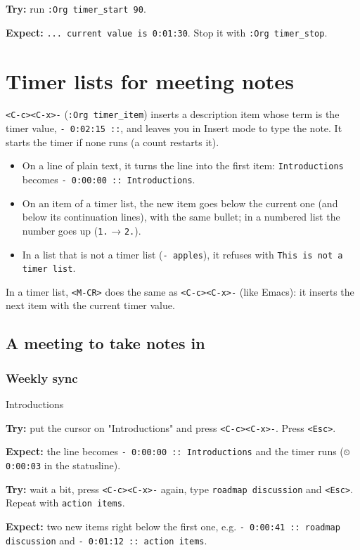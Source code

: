 \textbf{Try:} run \texttt{:Org timer\_start 90}.

\textbf{Expect:} \texttt{... current value is 0:01:30}. Stop it with \texttt{:Org timer\_stop}.
\section{Timer lists for meeting notes}
\label{sec:org4f0e106}
\texttt{<C-c><C-x>-} (\texttt{:Org timer\_item}) inserts a description item whose term is
the timer value, \texttt{- 0:02:15 ::}, and leaves you in Insert mode to type the
note. It starts the timer if none runs (a count restarts it).

\begin{itemize}
\item On a line of plain text, it turns the line into the first item:
\texttt{Introductions} becomes \texttt{- 0:00:00 :: Introductions}.
\item On an item of a timer list, the new item goes below the current one
(and below its continuation lines), with the same bullet; in a numbered
list the number goes up (\texttt{1.} → \texttt{2.}).
\item In a list that is not a timer list (\texttt{- apples}), it refuses with
\texttt{This is not a timer list}.
\end{itemize}

In a timer list, \texttt{<M-CR>} does the same as \texttt{<C-c><C-x>-} (like Emacs): it
inserts the next item with the current timer value.
\subsection{A meeting to take notes in}
\label{sec:orgffe733b}
\subsubsection{Weekly sync}
\label{sec:org5570f68}
Introductions

\textbf{Try:} put the cursor on "Introductions" and press \texttt{<C-c><C-x>-}. Press
\texttt{<Esc>}.

\textbf{Expect:} the line becomes \texttt{- 0:00:00 :: Introductions} and the timer runs
(\texttt{⏲ 0:00:03} in the statusline).

\textbf{Try:} wait a bit, press \texttt{<C-c><C-x>-} again, type \texttt{roadmap discussion}
and \texttt{<Esc>}. Repeat with \texttt{action items}.

\textbf{Expect:} two new items right below the first one, e.g.
\texttt{- 0:00:41 :: roadmap discussion} and \texttt{- 0:01:12 :: action items}.


